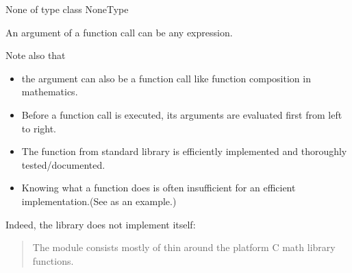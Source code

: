 \documentclass[letterpaper,10pt,english]{sphinxmanual}
\begin{document}
\begin{sphinxVerbatim}[commandchars=\\\{\}]
  
  
\end{sphinxVerbatim}

\begin{sphinxVerbatim}[commandchars=\\\{\}]
None of type \PYGZlt{}class \PYGZsq{}NoneType\PYGZsq{}\PYGZgt{}
\end{sphinxVerbatim}

An argument of a function call can be any expression.

\begin{sphinxVerbatim}[commandchars=\\\{\}]
   
\end{sphinxVerbatim}

Note also that
\begin{itemize}
\item {} 
the argument can also be a function call like function composition in mathematics.

\item {} 
Before a function call is executed, its arguments are evaluated first from left to right.

\end{itemize}

\begin{itemize}
\item {} 
The function from standard library is efficiently implemented and thoroughly tested/documented.

\item {} 
Knowing what a function does is often insufficient for an efficient implementation.(See  as an example.)

\end{itemize}

Indeed, the  library does not implement  itself:
\begin{quote}

 The  module consists mostly of thin  around the platform C math library functions. \sphinxhyphen{} 
\end{quote}
\end{document}
